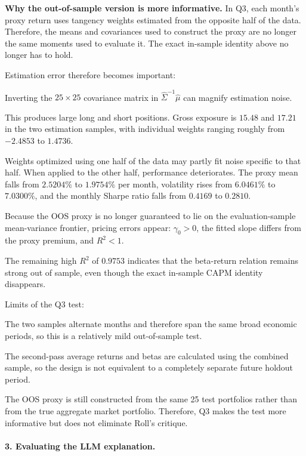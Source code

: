 \textbf{Why the out-of-sample version is more informative.} In Q3, each month's
proxy return uses tangency weights estimated from the opposite half of the
data. Therefore, the means and covariances used to construct the proxy are no
longer the same moments used to evaluate it. The exact in-sample identity above
no longer has to hold.

Estimation error therefore becomes important:
\begin{tight}
\item Inverting the $25\times25$ covariance matrix in
$\hat\Sigma^{-1}\hat\mu$
can magnify estimation noise.
\item This produces large long and short positions. Gross exposure is $15.48$
and $17.21$ in the two estimation samples, with individual weights ranging
roughly from $-2.4853$ to $1.4736$.
\item Weights optimized using one half of the data may partly fit noise
specific to that half. When applied to the other half, performance
deteriorates. The proxy mean falls from $2.5204\%$ to $1.9754\%$ per month,
volatility rises from $6.0461\%$ to $7.0300\%$, and the monthly Sharpe ratio
falls from $0.4169$ to $0.2810$.
\item Because the OOS proxy is no longer guaranteed to lie on the
evaluation-sample mean-variance frontier, pricing errors appear:
$\gamma_0 > 0$, the fitted slope differs from the proxy premium, and
$R^2 < 1$.
\end{tight}

The remaining high $R^2$ of $0.9753$ indicates that the beta-return relation
remains strong out of sample, even though the exact in-sample CAPM identity
disappears.

Limits of the Q3 test:
\begin{tight}
\item The two samples alternate months and therefore span the same broad
economic periods, so this is a relatively mild out-of-sample test.
\item The second-pass average returns and betas are calculated using the
combined sample, so the design is not equivalent to a completely separate
future holdout period.
\item The OOS proxy is still constructed from the same 25 test portfolios
rather than from the true aggregate market portfolio. Therefore, Q3 makes the
test more informative but does not eliminate Roll's critique.
\end{tight}

\paragraph{3. Evaluating the LLM explanation.}

